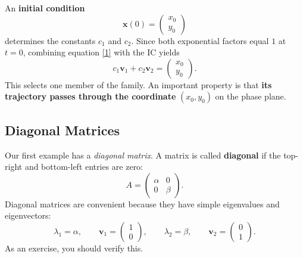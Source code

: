 \documentclass[11pt,letterpaper]{article}
\begin{document}
An \textbf{initial condition}
\[
    \mathbf{x}(0)=
    \begin{pmatrix}x_0\\y_0\end{pmatrix}
\]
determines the constants $c_1$ and $c_2$.
Since both exponential factors equal $1$ at $t=0$, combining equation \eqref{1} with the IC yields
\[
    c_1\mathbf{v}_1+c_2\mathbf{v}_2
    =\begin{pmatrix}x_0\\y_0\end{pmatrix}.
\]
This selects one member of the family.
An important property is that \textbf{its trajectory passes through the coordinate}
$(x_0,y_0)$ on the phase plane.


\subsection{Diagonal Matrices}

Our first example has a \textit{diagonal matrix}. A matrix is called \textbf{diagonal}
if the top-right and bottom-left entries are zero:
\[
    A=
    \begin{pmatrix}
        \alpha&0\\
        0&\beta
    \end{pmatrix}.
\]
Diagonal matrices are convenient because they have simple eigenvalues and eigenvectors:
\[
    \lambda_1=\alpha,\qquad
    \mathbf{v}_1=\begin{pmatrix}1\\0\end{pmatrix},
    \qquad
    \lambda_2=\beta,\qquad
    \mathbf{v}_2=\begin{pmatrix}0\\1\end{pmatrix}.
\]
As an exercise, you should verify this. 

\end{document}
